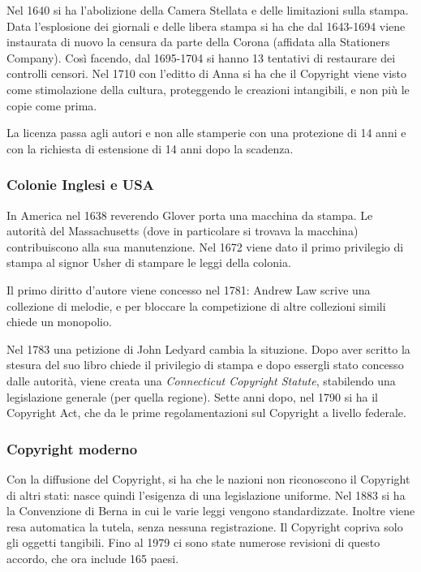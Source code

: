 Nel 1640 si ha l'abolizione della Camera Stellata e delle limitazioni sulla
stampa. Data l'esplosione dei giornali e delle libera stampa si ha che dal
1643-1694 viene instaurata di nuovo la censura da parte della Corona (affidata
alla Stationers Company). Cos\`i
facendo, dal 1695-1704 si hanno 13 tentativi di restaurare dei controlli
censori. Nel 1710 con l'editto di Anna si ha che il Copyright viene visto come
stimolazione della cultura, proteggendo le creazioni intangibili, e non pi\`u le
copie come prima.

La licenza passa agli autori e non alle stamperie con una protezione di 14 anni e con la richiesta di estensione di 14 anni dopo la scadenza.

\subsubsection{Colonie Inglesi e USA}

In America nel 1638 reverendo Glover porta una macchina da stampa. Le autorit\`a del Massachusetts (dove in particolare si trovava la macchina) contribuiscono alla sua manutenzione. Nel 1672 viene dato il primo privilegio di stampa al signor Usher di stampare le leggi della colonia.


Il primo diritto d'autore viene concesso nel 1781: Andrew Law scrive una collezione di melodie, e per bloccare la competizione di altre collezioni simili chiede un monopolio.

Nel 1783 una petizione di John Ledyard cambia la situzione. Dopo aver scritto la
stesura del suo libro chiede il privilegio di stampa e dopo essergli stato concesso dalle
autorit\`a, viene creata una \textit{Connecticut Copyright Statute}, stabilendo
una legislazione generale (per quella regione). Sette anni dopo, nel 1790 si ha
il Copyright Act, che da le prime regolamentazioni sul Copyright a livello federale.


\subsubsection{Copyright moderno}
Con la diffusione del Copyright, si ha che le nazioni non riconoscono il 
Copyright di altri stati: nasce quindi l'esigenza di una legislazione uniforme. 
Nel 1883 si ha la Convenzione di Berna in cui le varie leggi vengono standardizzate. 
Inoltre viene resa automatica la tutela, senza nessuna registrazione. 
Il Copyright copriva solo gli oggetti tangibili.
Fino al 1979 ci sono state numerose revisioni di questo accordo, che ora include
165 paesi. 

